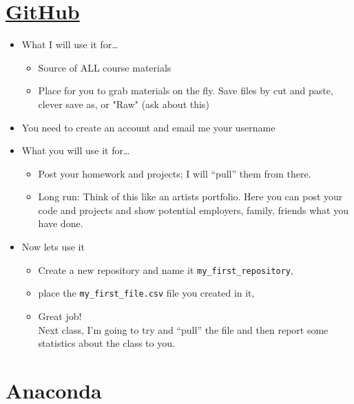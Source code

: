 \section*{\href{https://github.com}{GitHub}}
\begin{itemize}
\item What I will use it for\ldots
\begin{itemize}
\item Source of ALL course materials
\item Place for you to grab materials on the fly. Save files by cut and paste, clever save as, or "Raw" (ask about this)
\end{itemize}
\item You need to create an account and email me your username
\item What you will use it for\ldots
\begin{itemize}
\item Post your homework and projects; I will ``pull'' them from there.
\item Long run: Think of this like an artists portfolio. Here you can post your code and projects and show potential employers, family, friends what you have done.
\end{itemize}
\item Now lets use it
\begin{itemize}
\item Create a new repository and name it \verb|my_first_repository|,
\item place the \verb|my_first_file.csv| file you created in it,
\item Great job! \\
Next class, I'm going to try and ``pull'' the file and then report some statistics about the class to you.
\end{itemize}
\end{itemize}


\section*{Anaconda}

